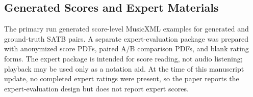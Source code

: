 \subsection{Generated Scores and Expert Materials}

The primary run generated score-level MusicXML examples for generated and ground-truth SATB pairs. A separate expert-evaluation package was prepared with anonymized score PDFs, paired A/B comparison PDFs, and blank rating forms. The expert package is intended for score reading, not audio listening; playback may be used only as a notation aid. At the time of this manuscript update, no completed expert ratings were present, so the paper reports the expert-evaluation design but does not report expert scores.

